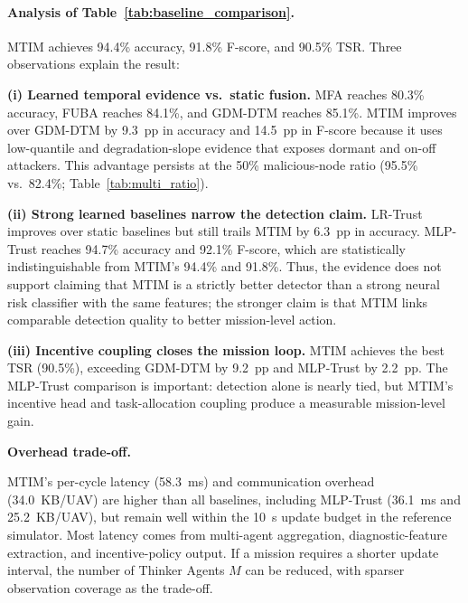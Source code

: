 \documentclass[notspecified,article,submit,moreauthors]{Definitions/mdpi}
\begin{document}
\paragraph{Analysis of Table~\ref{tab:baseline_comparison}.}
MTIM achieves 94.4\% accuracy, 91.8\% F-score, and 90.5\% TSR. Three observations explain the result:

\textbf{(i) Learned temporal evidence vs.\ static fusion.} MFA reaches 80.3\% accuracy, FUBA reaches 84.1\%, and GDM-DTM reaches 85.1\%. MTIM improves over GDM-DTM by 9.3~pp in accuracy and 14.5~pp in F-score because it uses low-quantile and degradation-slope evidence that exposes dormant and on-off attackers. This advantage persists at the 50\% malicious-node ratio (95.5\% vs.\ 82.4\%; Table~\ref{tab:multi_ratio}).

\textbf{(ii) Strong learned baselines narrow the detection claim.} LR-Trust improves over static baselines but still trails MTIM by 6.3~pp in accuracy. MLP-Trust reaches 94.7\% accuracy and 92.1\% F-score, which are statistically indistinguishable from MTIM's 94.4\% and 91.8\%. Thus, the evidence does not support claiming that MTIM is a strictly better detector than a strong neural risk classifier with the same features; the stronger claim is that MTIM links comparable detection quality to better mission-level action.

\textbf{(iii) Incentive coupling closes the mission loop.} MTIM achieves the best TSR (90.5\%), exceeding GDM-DTM by 9.2~pp and MLP-Trust by 2.2~pp. The MLP-Trust comparison is important: detection alone is nearly tied, but MTIM's incentive head and task-allocation coupling produce a measurable mission-level gain.

\noindent\textbf{Overhead trade-off.}\par
\noindent
MTIM's per-cycle latency (58.3~ms) and communication overhead (34.0~KB/UAV) are higher than all baselines, including MLP-Trust (36.1~ms and 25.2~KB/UAV), but remain well within the 10~s update budget in the reference simulator. Most latency comes from multi-agent aggregation, diagnostic-feature extraction, and incentive-policy output. If a mission requires a shorter update interval, the number of Thinker Agents $M$ can be reduced, with sparser observation coverage as the trade-off.
\end{document}
